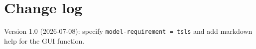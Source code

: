 \documentclass{article}
\begin{document}
\section{Change log}

Version 1.0 (2026-07-08): specify \texttt{model-requirement = tsls} and
add markdown help for the GUI function.



\end{document}
